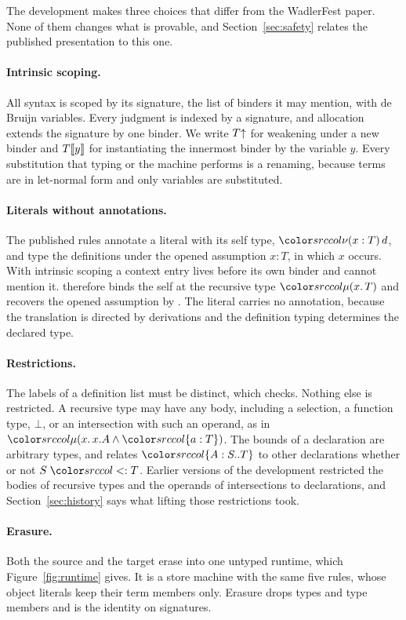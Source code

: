 The development makes three choices that differ from the WadlerFest paper. None of them changes what is provable, and Section~\ref{sec:safety} relates the published presentation to this one.

\paragraph{Intrinsic scoping.}
All syntax is scoped by its signature, the list of binders it may mention, with de Bruijn variables. Every judgment is indexed by a signature, and allocation extends the signature by one binder. We write $T{\uparrow}$ for weakening under a new binder and $T\llbracket y\rrbracket$ for instantiating the innermost binder by the variable $y$. Every substitution that typing or the machine performs is a renaming, because terms are in let-normal form and only variables are substituted.

\paragraph{Literals without annotations.}
The published rules annotate a literal with its self type, $\src{\nu(x : T)\,d}$, and type the definitions under the opened assumption $x : T$, in which $x$ occurs. With intrinsic scoping a context entry lives before its own binder and cannot mention it. \DOTMNF therefore binds the self at the recursive type $\dmu{x}{T}$ and recovers the opened assumption by . The literal carries no annotation, because the translation is directed by derivations and the definition typing determines the declared type.

\paragraph{Restrictions.}
The labels of a definition list must be distinct, which  checks. Nothing else is restricted. A recursive type may have any body, including a selection, a function type, $\bot$, or an intersection with such an operand, as in $\dmu{x}{x.A \wedge \dfld{a}{T}}$. The bounds of a declaration are arbitrary types, and  relates $\dtyp{A}{S}{T}$ to other declarations whether or not $S \sub T$. Earlier versions of the development restricted the bodies of recursive types and the operands of intersections to declarations, and Section~\ref{sec:history} says what lifting those restrictions took.

\paragraph{Erasure.}
Both the source and the target erase into one untyped runtime, which Figure~\ref{fig:runtime} gives. It is a store machine with the same five rules, whose object literals keep their term members only. Erasure drops types and type members and is the identity on signatures.

